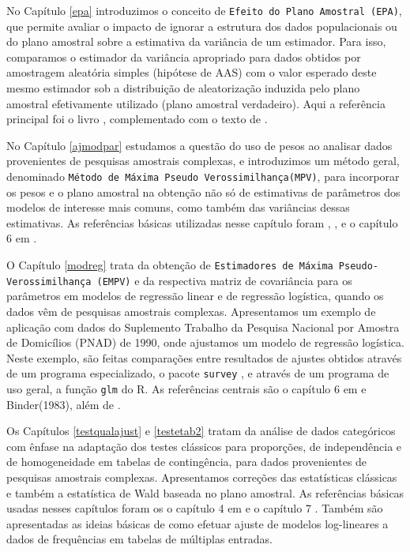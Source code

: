 \documentclass[]{book}
\theoremstyle{definition}
\theoremstyle{definition}
\theoremstyle{definition}
\theoremstyle{remark}
\begin{document}
No Capítulo \ref{epa} introduzimos o conceito de
\texttt{Efeito\ do\ Plano\ Amostral\ (EPA)}, que permite avaliar o
impacto de ignorar a estrutura dos dados populacionais ou do plano
amostral sobre a estimativa da variância de um estimador. Para isso,
comparamos o estimador da variância apropriado para dados obtidos por
amostragem aleatória simples (hipótese de AAS) com o valor esperado
deste mesmo estimador sob a distribuição de aleatorização induzida pelo
plano amostral efetivamente utilizado (plano amostral verdadeiro). Aqui
a referência principal foi o livro \citep{SHS89}, complementado com o
texto de \citep{lethonen}.

No Capítulo \ref{ajmodpar} estudamos a questão do uso de pesos ao
analisar dados provenientes de pesquisas amostrais complexas, e
introduzimos um método geral, denominado
\texttt{Método\ de\ Máxima\ Pseudo\ Verossimilhança(MPV)}, para
incorporar os pesos e o plano amostral na obtenção não só de estimativas
de parâmetros dos modelos de interesse mais comuns, como também das
variâncias dessas estimativas. As referências básicas utilizadas nesse
capítulo foram \citep{SHS89}, \citep{Pfeff}, \citep{binder83} e o
capítulo 6 em \citep{Silva}.

O Capítulo \ref{modreg} trata da obtenção de
\texttt{Estimadores\ de\ Máxima\ Pseudo-Verossimilhança\ (EMPV)} e da
respectiva matriz de covariância para os parâmetros em modelos de
regressão linear e de regressão logística, quando os dados vêm de
pesquisas amostrais complexas. Apresentamos um exemplo de aplicação com
dados do Suplemento Trabalho da Pesquisa Nacional por Amostra de
Domicílios (PNAD) de 1990, onde ajustamos um modelo de regressão
logística. Neste exemplo, são feitas comparações entre resultados de
ajustes obtidos através de um programa especializado, o pacote
\texttt{survey} \citep{R-survey}, e através de um programa de uso geral,
a função \texttt{glm} do R. As referências centrais são o capítulo 6 em
\citep{Silva} e Binder(1983), além de \citep{Pessoa}.

Os Capítulos \ref{testqualajust} e \ref{testetab2} tratam da análise de
dados categóricos com ênfase na adaptação dos testes clássicos para
proporções, de independência e de homogeneidade em tabelas de
contingência, para dados provenientes de pesquisas amostrais complexas.
Apresentamos correções das estatísticas clássicas e também a estatística
de Wald baseada no plano amostral. As referências básicas usadas nesses
capítulos foram os o capítulo 4 em \citep{SHS89} e o capítulo 7
\citep{lethonen}. Também são apresentadas as ideias básicas de como
efetuar ajuste de modelos log-lineares a dados de frequências em tabelas
de múltiplas entradas.
\end{document}
